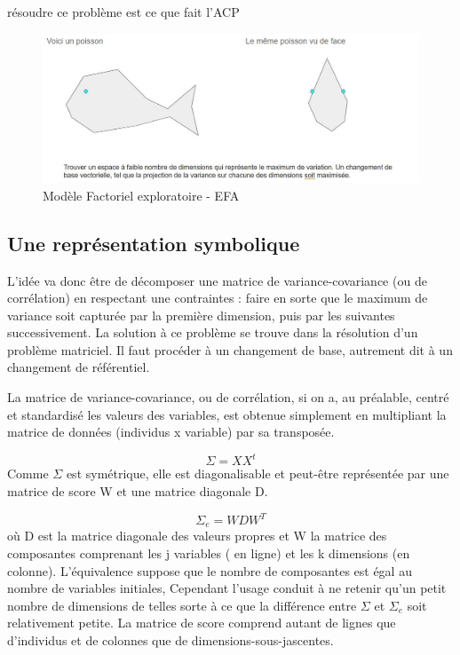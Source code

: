 \documentclass[
]{book}
\begin{document}
résoudre ce problème est ce que fait l'ACP

\begin{figure}
\centering
\includegraphics{./Images/ACp_poisson.jpg}
\caption{Modèle Factoriel exploratoire - EFA}
\end{figure}

\hypertarget{une-repruxe9sentation-symbolique}{%
\subsection{Une représentation symbolique}\label{une-repruxe9sentation-symbolique}}

L'idée va donc être de décomposer une matrice de variance-covariance (ou de corrélation) en respectant une contraintes : faire en sorte que le maximum de variance soit capturée par la première dimension, puis par les suivantes successivement. La solution à ce problème se trouve dans la résolution d'un problème matriciel. Il faut procéder à un changement de base, autrement dit à un changement de référentiel.

La matrice de variance-covariance, ou de corrélation, si on a, au préalable, centré et standardisé les valeurs des variables, est obtenue simplement en multipliant la matrice de données (individus x variable) par sa transposée.

\[
\Sigma = XX^t
\]
Comme \(\Sigma\) est symétrique, elle est diagonalisable et peut-être représentée par une matrice de score W et une matrice diagonale D.

\[
\Sigma_{e} =WDW^T
\]
où D est la matrice diagonale des valeurs propres et W la matrice des composantes comprenant les j variables ( en ligne) et les k dimensions (en colonne). L'équivalence suppose que le nombre de composantes est égal au nombre de variables initiales, Cependant l'usage conduit à ne retenir qu'un petit nombre de dimensions de telles sorte à ce que la différence entre \(\Sigma\) et \(\Sigma_{e}\) soit relativement petite. La matrice de score comprend autant de lignes que d'individus et de colonnes que de dimensions-sous-jascentes.
\end{document}
